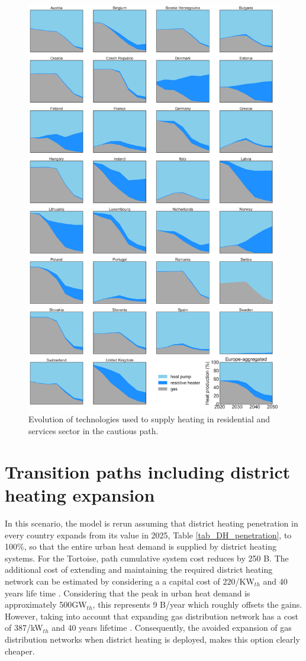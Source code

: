 \documentclass[3p]{elsarticle} %
\begin{document}
\begin{figure}[!h]
\centering
\includegraphics[width=0.8\columnwidth]{figures/heat_production_w_TYNDP_go.png}
\caption{Evolution of technologies used to supply heating in residential and services sector in the cautious path. } \label{fig_heating_shares} 
\end{figure}

\FloatBarrier

\section{Transition paths including district heating expansion}

In this scenario, the model is rerun assuming that district heating penetration in every country expands from its value in 2025, Table \ref{tab_DH_penetration}, to 100\%, so that the entire urban heat demand is supplied by district heating systems.
For the Tortoise, path cumulative system cost reduces by 250 B\EUR. The additional cost of extending and maintaining the required district heating network can be estimated by considering a a capital cost of 220\EUR/KW$_{th}$ and 40 years life time \cite{Brown_2018, Gerhardt_2015}. Considering that the peak in urban heat demand is approximately 500GW$_{th}$, this represents 9 B\EUR/year which roughly offsets the gains. However, taking into account that expanding gas distribution network has a cost of 387\EUR/kW$_{th}$ and 40 years lifetime \cite{Brown_2018, gas_distribution}. Consequently, the avoided expansion of gas distribution networks when district heating is deployed, makes this option clearly cheaper. 
\end{document}
